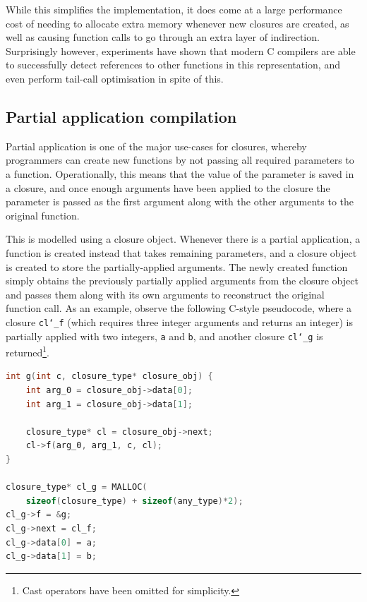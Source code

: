 \documentclass[12pt,a4paper,twoside,openright]{report}
\begin{document}
While this simplifies the implementation, it does come at a large performance 
cost of needing to allocate extra memory whenever new closures are created, as 
well as causing function calls to go through an extra layer of indirection. 
Surprisingly however, experiments have shown that modern C compilers are able 
to successfully detect references to other functions in this representation, 
and even perform tail-call optimisation in spite of this.

\subsection{Partial application compilation} \label{partial-app}

Partial application is one of the major use-cases for closures, whereby 
programmers can create new functions by not passing all required parameters to 
a function. Operationally, this means that the value of the parameter is saved 
in a closure, and once enough arguments have been applied to the closure the 
parameter is passed as the first argument along with the other arguments to the 
original function.

This is modelled using a closure object. Whenever there is a partial 
application, a function is created instead that takes remaining parameters, and 
a closure object is created to store the partially-applied arguments. The newly 
created function simply obtains the previously partially applied arguments from 
the closure object and passes them along with its own arguments to reconstruct 
the original function call. As an example, observe the following C-style 
pseudocode, where a closure \texttt{cl\char`_f} (which requires three integer 
arguments and returns an integer) is partially applied with two integers, 
\texttt{a} and \texttt{b}, and another closure \texttt{cl\char`_g} is
returned\footnote{Cast operators have been omitted for simplicity.}.

\begin{lstlisting}[language=C]
int g(int c, closure_type* closure_obj) {
    int arg_0 = closure_obj->data[0];
    int arg_1 = closure_obj->data[1];
    
    closure_type* cl = closure_obj->next;
    cl->f(arg_0, arg_1, c, cl);
}

closure_type* cl_g = MALLOC(
    sizeof(closure_type) + sizeof(any_type)*2);
cl_g->f = &g;
cl_g->next = cl_f;
cl_g->data[0] = a;
cl_g->data[1] = b;
\end{lstlisting}
\end{document}
